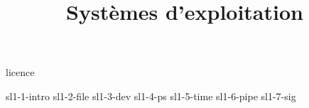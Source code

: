 \documentclass {beamer}
\title {Systèmes d'exploitation}
\begin{document}

 {licence}

 {sl1-1-intro}
 {sl1-2-file}
 {sl1-3-dev}
 {sl1-4-ps}
 {sl1-5-time}
 {sl1-6-pipe}
 {sl1-7-sig}
\end{document}
